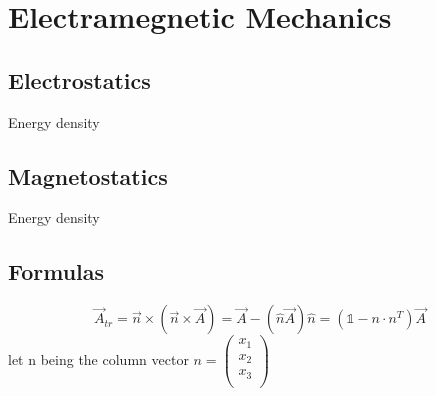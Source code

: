 \chapter{Electramegnetic Mechanics}

\section{Electrostatics}
Energy density
\begin{equation}
\end{equation}

\section{Magnetostatics}
Energy density
\begin{equation}
\end{equation}

\section{Formulas}
\[
    \vec{A}_{tr} = \vec{n}\times(\vec{n}\times\vec{A}) = \vec{A}-(\hat{n}\vec{A})\hat{n} = (\mathds{1}-n\cdot n^T)\vec{A}
\]
let n being the column vector 
$n=\begin{pmatrix}
    x_1	\\
    x_2	\\
    x_3	\\
\end{pmatrix}$

